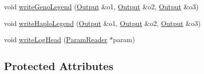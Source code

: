 \begin{DoxyCompactItemize}
\item 
void \hyperlink{classSnpgwaOutput_a429ecd2ef4d0112dd889b5b36f858ab7}{writeGenoLegend} (\hyperlink{classOutput}{Output} \&o1, \hyperlink{classOutput}{Output} \&o2, \hyperlink{classOutput}{Output} \&o3)
\item 
void \hyperlink{classSnpgwaOutput_a0d4bcf07b492d77a4211ed5ed5fe6397}{writeHaploLegend} (\hyperlink{classOutput}{Output} \&o1, \hyperlink{classOutput}{Output} \&o2, \hyperlink{classOutput}{Output} \&o3)
\item 
void \hyperlink{classSnpgwaOutput_a540b0cec05790adca12054a89ab1b676}{writeLogHead} (\hyperlink{classParamReader}{ParamReader} $\ast$param)
\end{DoxyCompactItemize}
\subsection*{Protected Attributes}
